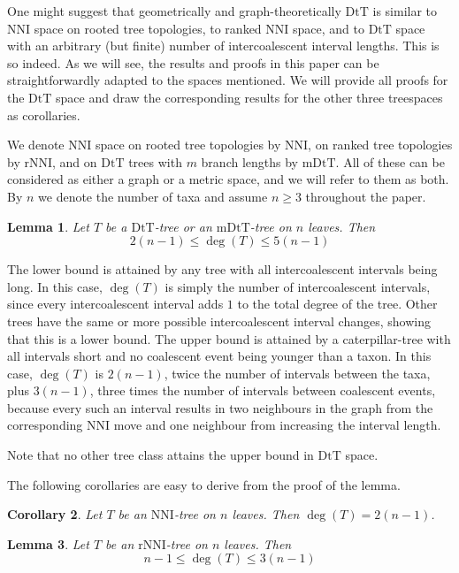 \documentclass{amsart}
\newtheorem{lemma}{Lemma}
\newtheorem{corollary}[lemma]{Corollary}
\newcommand{\dts}{\mathrm{DtT}}
\newcommand{\nni}{\mathrm{NNI}}
\newcommand{\rnni}{\mathrm{rNNI}}
\newcommand{\mdts}{\mathrm{mDtT}}
\begin{document}
One might suggest that geometrically and graph-theoretically $\dts$ is similar to NNI space on rooted tree topologies, to ranked NNI space, and to $\dts$ space with an arbitrary (but finite) number of intercoalescent interval lengths.
This is so indeed.
As we will see, the results and proofs in this paper can be straightforwardly adapted to the spaces mentioned.
We will provide all proofs for the $\dts$ space and draw the corresponding results for the other three treespaces as corollaries.

We denote NNI space on rooted tree topologies by $\nni$, on ranked tree topologies by $\rnni$, and on $\dts$ trees with $m$ branch lengths by $\mdts$.
All of these can be considered as either a graph or a metric space, and we will refer to them as both.
By $n$ we denote the number of taxa and assume $n \geq 3$ throughout the paper.

\begin{lemma}\label{neighBound}
Let $T$ be a $\dts$-tree or an $\mdts$-tree on $n$ leaves. Then \[2(n-1)\leq \deg(T)\leq5(n-1)\]
\end{lemma}

\proof
The lower bound is attained by any tree with all intercoalescent intervals being long.
In this case, $\deg(T)$ is simply the number of intercoalescent intervals, since every intercoalescent interval adds $1$ to the total degree of the tree.
Other trees have the same or more possible intercoalescent interval changes, showing that this is a lower bound.
The upper bound is attained by a caterpillar-tree with all intervals short and no coalescent event being younger than a taxon.
In this case, $\deg(T)$ is $2(n-1)$, twice the number of intervals between the taxa, plus $3(n-1)$, three times the number of intervals between coalescent events, because every such an interval results in two neighbours in the graph from the corresponding NNI move and one neighbour from increasing the interval length.

Note that no other tree class attains the upper bound in $\dts$ space.
\endproof

The following corollaries are easy to derive from the proof of the lemma.

\begin{corollary}
Let $T$ be an $\nni$-tree on $n$ leaves. Then $\deg(T) = 2(n-1)$.
\end{corollary}

\begin{lemma}\label{cor_deg_rNNI}
Let $T$ be an $\rnni$-tree on $n$ leaves. Then \[n-1\leq \deg(T)\leq3(n-1)\]
\end{lemma}
\end{document}
